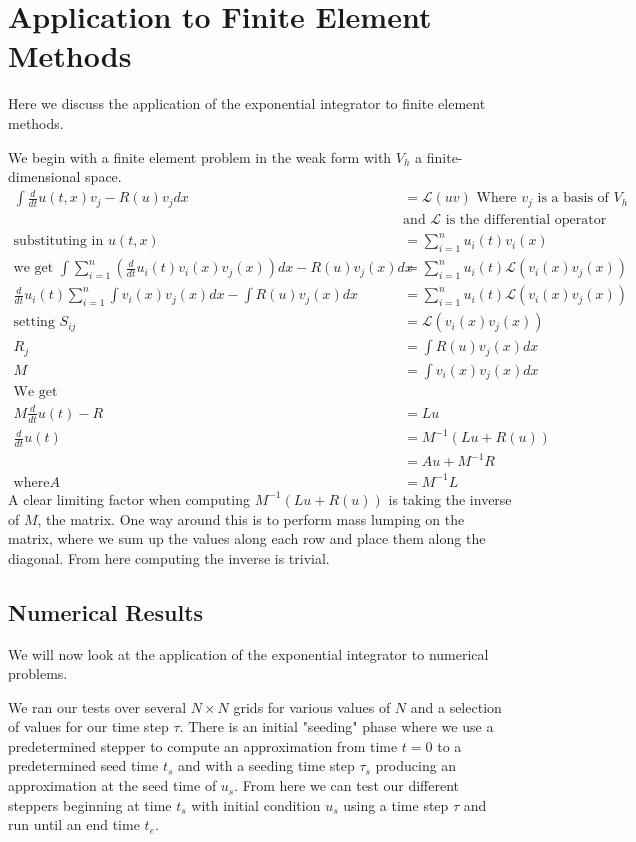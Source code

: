 \documentclass{article}
\begin{document}
\section{Application to Finite Element Methods}
Here we discuss the application of the exponential integrator to finite element methods.

We begin with a finite element problem in the weak form with $V_h$ a finite-dimensional space.
\begin{align*}
\int \frac d{dt}u(t,x) v_j - R(u) v_j dx &= \mathcal{L}(uv)\text{ Where $v_j$ is a basis of $V_h$}\\
&\text{and $\mathcal{L}$ is the differential operator}\\
\text{substituting in } u(t,x) &= \sum_{i=1}^n u_i(t)v_i(x)\\
\text{we get } \int\sum_{i=1}^n(\frac d{dt}u_i(t)v_i(x)v_j(x))dx - R(u)v_j(x)dx &= \sum_{i=1}^n u_i(t)\mathcal{L}(v_i(x)v_j(x))\\
\frac d{dt}u_i(t)\sum_{i=1}^n\int v_i(x)v_j(x)dx - \int R(u)v_j(x)dx &= \sum_{i=1}^n u_i(t)\mathcal{L}(v_i(x)v_j(x))\\
\text{setting } S_{ij} &= \mathcal{L}(v_i(x)v_j(x))\\
R_j &= \int R(u)v_j(x)dx\\
M &= \int v_i(x)v_j(x)dx\\
\text{We get}\\
M\frac d{dt}u(t) - R &= Lu\\
\frac d{dt}u(t) &= M^{-1}(Lu + R(u))\\
&=Au+M^{-1}R\\
\text{where} A &= M^{-1}L
\end{align*}
A clear limiting factor when computing $M^{-1}(Lu + R(u))$ is taking the inverse of $M$, the matrix.
One way around this is to perform mass lumping on the matrix, where we sum up the values along each row and place them along the diagonal.
From here computing the inverse is trivial.

\subsection{Numerical Results}
We will now look at the application of the exponential integrator to numerical problems.

We ran our tests over several $N\times N$ grids for various values of $N$ and a selection of values for our time step $\tau$.
There is an initial "seeding" phase where we use a predetermined stepper to compute an approximation from time $t=0$ to a predetermined seed time $t_s$ and with a seeding time step $\tau_s$ producing an approximation at the seed time of $u_s$.
From here we can test our different steppers beginning at time $t_s$ with initial condition $u_s$ using a time step $\tau$ and run until an end time $t_e$.
\end{document}
